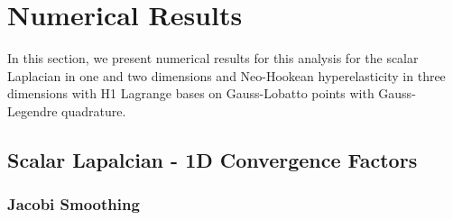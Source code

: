 \documentclass[review]{siamart190516}
\begin{document}
\section{Numerical Results}\label{sec:results}

In this section, we present numerical results for this analysis for the scalar Laplacian in one and two dimensions and Neo-Hookean hyperelasticity in three dimensions with H1 Lagrange bases on Gauss-Lobatto points with Gauss-Legendre quadrature.

\subsection{Scalar Lapalcian - 1D Convergence Factors}\label{sec:1dresults}

\subsubsection{Jacobi Smoothing}
\end{document}
